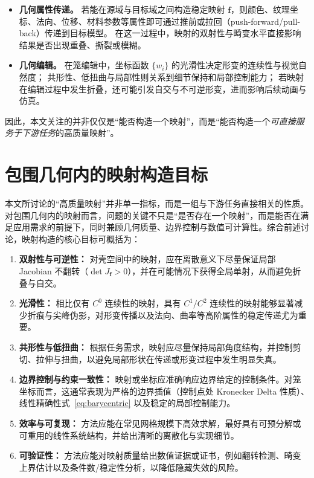 \begin{itemize}
  \item \textbf{几何属性传递。}
  若能在源域与目标域之间构造稳定映射 $\mathbf{f}$，则颜色、纹理坐标、法向、位移、材料参数等属性即可通过推前或拉回（push-forward/pull-back）传递到目标模型。
  在这一过程中，映射的双射性与畸变水平直接影响结果是否出现重叠、撕裂或模糊。
  \item \textbf{几何编辑。}
  在笼编辑中，坐标函数 $\{w_i\}$ 的光滑性决定形变的连续性与视觉自然度；
  共形性、低扭曲与局部性则关系到细节保持和局部控制能力；
  若映射在编辑过程中发生折叠，还可能引发自交与不可逆形变，进而影响后续动画与仿真。
\end{itemize}

因此，本文关注的并非仅仅是“能否构造一个映射”，而是“能否构造一个\emph{可直接服务于下游任务}的高质量映射”。
\section{包围几何内的映射构造目标}

本文所讨论的“高质量映射”并非单一指标，而是一组与下游任务直接相关的性质。对包围几何内的映射而言，问题的关键不只是“是否存在一个映射”，而是能否在满足应用需求的前提下，同时兼顾几何质量、边界控制与数值可计算性。综合前述讨论，映射构造的核心目标可概括为：

\begin{enumerate}
  \item \textbf{双射性与可逆性：} 对壳空间中的映射，应在离散意义下尽量保证局部 Jacobian 不翻转（$\det J_{\mathbf{f}} > 0$），并在可能情况下获得全局单射，从而避免折叠与自交。
  \item \textbf{光滑性：} 相比仅有 $C^0$ 连续性的映射，具有 $C^1/C^2$ 连续性的映射能够显著减少折痕与尖峰伪影，对形变传播以及法向、曲率等高阶属性的稳定传递尤为重要。
  \item \textbf{共形性与低扭曲：} 根据任务需求，映射应尽量保持局部角度结构，并控制剪切、拉伸与扭曲，以避免局部形状在传递或形变过程中发生明显失真。
  \item \textbf{边界控制与约束一致性：} 映射或坐标应准确响应边界给定的控制条件。对笼坐标而言，这通常表现为严格的边界插值（控制点处 Kronecker Delta 性质）、线性精确性式~\ref{eq:barycentric} 以及稳定的局部控制能力。
  \item \textbf{效率与可复现：} 方法应能在常见网格规模下高效求解，最好具有可预分解或可重用的线性系统结构，并给出清晰的离散化与实现细节。
  \item \textbf{可验证性：} 方法应能对映射质量给出数值证据或证书，例如翻转检测、畸变上界估计以及条件数/稳定性分析，以降低隐藏失效的风险。
\end{enumerate}

